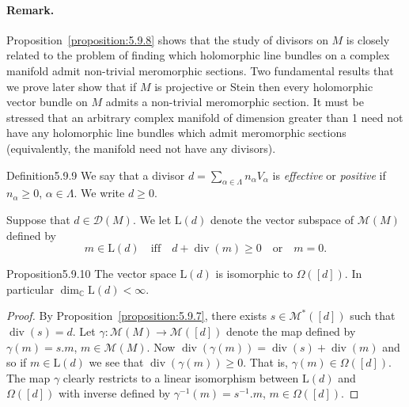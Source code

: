 \paragraph{Remark.} Proposition~\ref{proposition:5.9.8} shows that the study of divisors on $M$ is closely related to the problem of finding which holomorphic line bundles on a complex manifold admit non-trivial meromorphic sections. Two fundamental results that we prove later show that if $M$ is projective or Stein then every holomorphic vector bundle on $M$ admits a non-trivial meromorphic section. It must be stressed that an arbitrary complex manifold of dimension greater than 1 need not have any holomorphic line bundles which admit meromorphic sections (equivalently, the manifold need not have any divisors).
\begin{originaltheorem}{Definition}{5.9.9}
We say that a divisor $d=\sum_{\alpha\in\Lambda}n_\alpha V_\alpha$ is \emph{effective} or \emph{positive} if $n_\alpha\geq0$, $\alpha\in\Lambda$. We write $d\geq0$.
\end{originaltheorem}
Suppose that $d\in\mathcal D(M)$. We let $\mathrm L(d)$ denote the vector subspace of $\mathcal M(M)$ defined by
\[m\in\mathrm L(d)\quad\text{iff}\quad d+\operatorname{div}(m)\geq0\quad\text{or}\quad m=0.\]
\begin{originaltheorem}{Proposition}{5.9.10}
The vector space $\mathrm L(d)$ is isomorphic to $\Omega([d])$. In particular $\dim_{\mathbb C}\mathrm L(d)<\infty$.
\end{originaltheorem}
\begin{proof}
By Proposition~\ref{proposition:5.9.7}, there exists $s\in\mathcal M^*([d])$ such that $\operatorname{div}(s)=d$. Let $\gamma:\mathcal M(M)\to\mathcal M([d])$ denote the map defined by $\gamma(m)=s.m$, $m\in\mathcal M(M)$. Now $\operatorname{div}(\gamma(m))=\operatorname{div}(s)+\operatorname{div}(m)$ and so if $m\in\mathrm L(d)$ we see that $\operatorname{div}(\gamma(m))\geq0$. That is, $\gamma(m)\in\Omega([d])$. The map $\gamma$ clearly restricts to a linear isomorphism between $\mathrm L(d)$ and $\Omega([d])$ with inverse defined by $\gamma^{-1}(m)=s^{-1}.m$, $m\in\Omega([d])$.
\end{proof}
